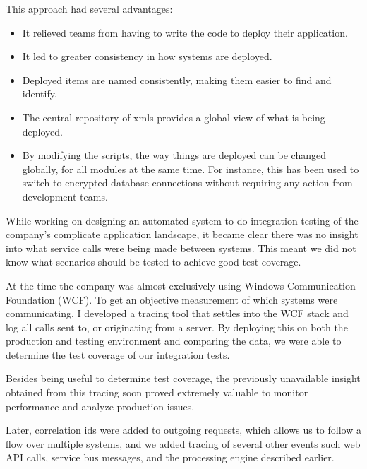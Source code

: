 \documentclass[10pt,a4paper]{../altacv}
\begin{document}
\begin{fullwidth}
		\medskip\medskip
		
		This approach had several advantages:
		
		\medskip
		
		\begin{itemize}
			\item\small It relieved teams from having to write the code to deploy their application.
			\item\small It led to greater consistency in how systems are deployed.
			\item\small Deployed items are named consistently, making them easier to find and identify.
			\item\small The central repository of xmls provides a global view of what is being deployed.
			\item\small By modifying the scripts, the way things are deployed can be changed globally, for all modules at the same time. For instance, this has been used to switch to encrypted database connections without requiring any action from development teams.
		\end{itemize}
		
		\bigskip\bigskip
		
		\cvsubsection{Service call tracing}{}{}{}
		While working on designing an automated system to do integration testing of the company’s complicate application landscape, it became clear there was no insight into what service calls were being made between systems. This meant we did not know what scenarios should be tested to achieve good test coverage.
		
		\medskip\medskip
		
		At the time the company was almost exclusively using Windows Communication Foundation (WCF). To get an objective measurement of which systems were communicating, I developed a tracing tool that settles into the WCF stack and log all calls sent to, or originating from a server. By deploying this on both the production and testing environment and comparing the data, we were able to determine the test coverage of our integration tests.
		
		\medskip\medskip
		
		Besides being useful to determine test coverage, the previously unavailable insight obtained from this tracing soon proved extremely valuable to monitor performance and analyze production issues.
		
		\medskip\medskip
		
		Later, correlation ids were added to outgoing requests, which allows us to follow a flow over multiple systems, and we added tracing of several other events such web API calls, service bus messages, and the processing engine described earlier. 
		

\end{fullwidth}
\end{document}
